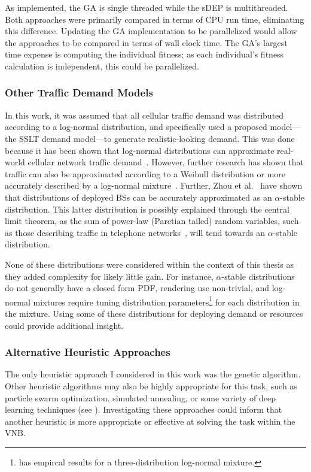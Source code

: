 \documentclass[12pt,dvipsnames]{report}
\begin{document}
As implemented, the GA is single threaded while the sDEP is multithreaded.  Both approaches were primarily compared in terms of CPU run time, eliminating this difference.  Updating the GA implementation to be parallelized would allow the approaches to be compared in terms of wall clock time.  The GA's largest time expense is computing the individual fitness; as each individual's fitness calculation is independent, this could be parallelized.

\subsubsection{Other Traffic Demand Models}

In this work, it was assumed that all cellular traffic demand was distributed according to a log-normal distribution, and specifically used a proposed model---the SSLT demand model---to generate realistic-looking demand.  This was done because it has been shown that log-normal distributions can approximate real-world cellular network traffic demand~\cite{686105}.  However, further research has shown that traffic can also be approximated according to a Weibull distribution or more accurately described by a log-normal mixture~\cite{5936263, 6757900}.  Further, Zhou et al.~\cite{7202841} have shown that distributions of deployed BSs can be accurately approximated as an $\alpha$-stable distribution.  This latter distribution is possibly explained through the central limit theorem, as the sum of power-law (Paretian tailed) random variables, such as those describing traffic in telephone networks~\cite{PhysRevE.72.026116}, will tend towards an $\alpha$-stable distribution.

None of these distributions were considered within the context of this thesis as they added complexity for likely little gain.  For instance, $\alpha$-stable distributions do not generally have a closed form PDF, rendering use non-trivial, and log-normal mixtures require tuning distribution parameters\footnote{\cite{6757900} has empircal results for a three-distribution log-normal mixture.} for each distribution in the mixture.  Using some of these distributions for deploying demand or resources could provide additional insight.

\subsubsection{Alternative Heuristic Approaches}

The only heuristic approach I considered in this work was the genetic algorithm.  Other heuristic algorithms may also be highly appropriate for this task, such as particle swarm optimization, simulated annealing, or some variety of deep learning techniques (see ).  Investigating these approaches could inform that another heuristic is more appropriate or effective at solving the task within the VNB.
\end{document}
